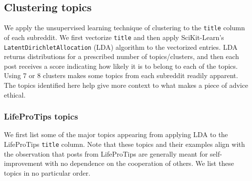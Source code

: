\documentclass{amsart}
\theoremstyle{definition}
\theoremstyle{remark}
\begin{document}
\subsection{Clustering topics}

We apply the unsupervised learning technique of clustering to the \texttt{title} column of each subreddit.  We first vectorize \texttt{title} and then apply SciKit-Learn's \texttt{LatentDirichletAllocation}  (LDA) algorithm to the vectorized entries.  LDA returns distributions for a prescribed number of topics/clusters,  and then each post receives a score indicating how likely it is to belong to each of the topics. Using 7 or 8 clusters makes some topics from each subreddit readily apparent.  The topics identified here help give more context to what makes a piece of advice ethical.

\subsubsection{LifeProTips topics}
We first list some of the major topics appearing from applying LDA to the LifeProTips \texttt{title} column. Note that these topics and their examples align with the observation that posts from LifeProTips are generally meant for self-improvement with no dependence on the cooperation of others.  We list these topics in no particular order. 
\end{document}
